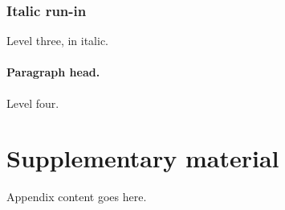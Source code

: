 \documentclass[11pt]{article}
\theoremstyle{plain}
\theoremstyle{definition}
\theoremstyle{remark}
\begin{document}
\subsubsection{Italic run-in}
Level three, in italic.

\paragraph{Paragraph head.} Level four.

\appendix
\section{Supplementary material}

Appendix content goes here.



\end{document}
